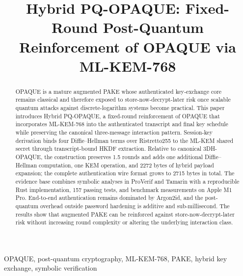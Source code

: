 \documentclass[conference]{IEEEtran}
\begin{document}
\title{Hybrid PQ-OPAQUE: Fixed-Round Post-Quantum Reinforcement of OPAQUE via ML-KEM-768}


\author{
}

\maketitle

\begin{abstract}
OPAQUE is a mature augmented PAKE whose authenticated key-exchange core remains classical and therefore exposed to store-now-decrypt-later risk once scalable quantum attacks against discrete-logarithm systems become practical. This paper introduces Hybrid PQ-OPAQUE, a fixed-round reinforcement of OPAQUE that incorporates ML-KEM-768 into the authenticated transcript and final key schedule while preserving the canonical three-message interaction pattern. Session-key derivation binds four Diffie--Hellman terms over Ristretto255 to the ML-KEM shared secret through transcript-bound HKDF extraction. Relative to canonical 3DH-OPAQUE, the construction preserves 1.5 rounds and adds one additional Diffie--Hellman computation, one KEM operation, and 2272 bytes of hybrid payload expansion; the complete authentication wire format grows to 2715 bytes in total. The evidence base combines symbolic analyses in ProVerif and Tamarin with a reproducible Rust implementation, 157 passing tests, and benchmark measurements on Apple M1 Pro. End-to-end authentication remains dominated by Argon2id, and the post-quantum overhead outside password hardening is additive and sub-millisecond. The results show that augmented PAKE can be reinforced against store-now-decrypt-later risk without increasing round complexity or altering the underlying interaction class.
\end{abstract}

\begin{IEEEkeywords}
OPAQUE, post-quantum cryptography, ML-KEM-768, PAKE, hybrid key exchange, symbolic verification
\end{IEEEkeywords}
\end{document}
